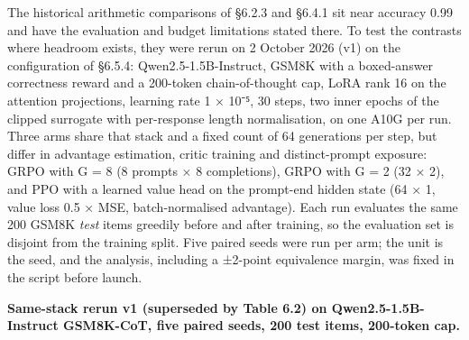 \documentclass[12pt,a4paper]{report}
\begin{document}
The historical arithmetic comparisons of §6.2.3 and §6.4.1 sit near
accuracy 0.99 and have the evaluation and budget limitations stated
there. To test the contrasts where headroom exists, they were rerun on 2
October 2026 (v1) on the configuration of §6.5.4: Qwen2.5-1.5B-Instruct,
GSM8K with a boxed-answer correctness reward and a 200-token
chain-of-thought cap, LoRA rank 16 on the attention projections,
learning rate 1 × 10⁻⁵, 30 steps, two inner epochs of the clipped
surrogate with per-response length normalisation, on one A10G per run.
Three arms share that stack and a fixed count of 64 generations per
step, but differ in advantage estimation, critic training and
distinct-prompt exposure: GRPO with G = 8 (8 prompts × 8 completions),
GRPO with G = 2 (32 × 2), and PPO with a learned value head on the
prompt-end hidden state (64 × 1, value loss 0.5 × MSE, batch-normalised
advantage). Each run evaluates the same 200 GSM8K \emph{test} items
greedily before and after training, so the evaluation set is disjoint
from the training split. Five paired seeds were run per arm; the unit is
the seed, and the analysis, including a ±2-point equivalence margin, was
fixed in the script before launch.

\textbf{Same-stack rerun v1 (superseded by Table 6.2) on
Qwen2.5-1.5B-Instruct GSM8K-CoT, five paired seeds, 200 test items,
200-token cap.}
\end{document}
